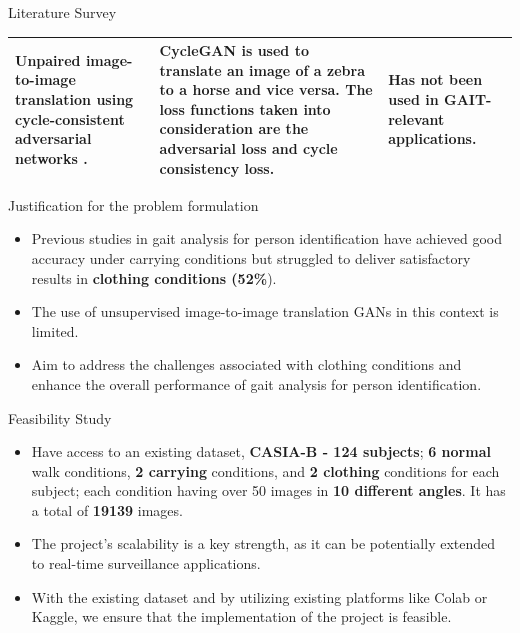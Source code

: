 \documentclass[xcolor=dvipsnames]{beamer}
\begin{document}
\begin{frame}{Literature Survey}
\begin{table}
  \begin{tabular}{|p{3cm}|p{5cm}|p{3cm}|}
    Unpaired image-to-image translation using cycle-consistent adversarial networks \cite{zhu2017}.&
    CycleGAN is used to translate an image of a zebra to a horse and vice versa. The loss functions taken into consideration are the adversarial loss and cycle consistency loss.&
    Has not been used in GAIT-relevant applications.  \\
    \hline
  \end{tabular}

\end{table}
    
    
\end{frame}

\begin{frame}{Justification for the problem formulation}

\begin{itemize}
\item Previous studies in gait analysis for person identification have achieved good accuracy under carrying conditions but struggled to deliver satisfactory results in {\bf clothing conditions (52\%}).
\item The use of unsupervised image-to-image translation GANs in this context is limited.
\item  Aim to address the challenges associated with clothing conditions and enhance the overall performance of
gait analysis for person identification.

\end{itemize}
\end{frame}

\begin{frame}{Feasibility Study}
    \begin{itemize}
        \item Have access to an existing dataset, {\bf CASIA-B - 124 subjects}; {\bf 6 normal} walk conditions, {\bf 2 carrying} conditions, and {\bf 2 clothing} conditions for each subject; each condition having over 50 images in {\bf 10 different angles}. It has a total of {\bf 19139} images.
        \item The project’s scalability is a key strength, as it can be potentially extended to real-time surveillance applications.
        \item  With the existing dataset and by utilizing existing platforms like Colab or Kaggle, we ensure that the implementation of the project is feasible. 
    \end{itemize}
\end{frame}
\end{document}
